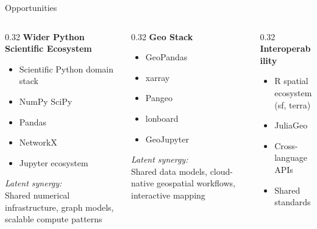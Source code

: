 \documentclass[11pt, aspectratio=169]{beamer}
\begin{document}
\begin{frame}{Opportunities}
\centering
\vspace{0.5cm}

\begin{columns}[T,onlytextwidth]

\begin{column}{0.32\textwidth}
\textbf{Wider Python Scientific Ecosystem}

\vspace{0.4cm}
\begin{itemize}
\item Scientific Python domain stack
\item NumPy SciPy
\item Pandas
\item NetworkX
\item Jupyter ecosystem
\end{itemize}

\vspace{0.3cm}
{\small \textit{Latent synergy:}}\\
Shared numerical infrastructure, graph models, scalable compute patterns
\end{column}

\begin{column}{0.32\textwidth}
\textbf{Geo Stack}

\vspace{0.4cm}
\begin{itemize}
\item GeoPandas
\item xarray
\item Pangeo
\item lonboard
\item GeoJupyter
\end{itemize}

\vspace{0.3cm}
{\small \textit{Latent synergy:}}\\
Shared data models, cloud-native geospatial workflows, interactive mapping
\end{column}

\begin{column}{0.32\textwidth}
\textbf{Interoperability}

\vspace{0.4cm}
\begin{itemize}
\item R spatial ecosystem (sf, terra)
\item JuliaGeo
\item Cross-language APIs
\item Shared standards
\end{itemize}


\end{column}
\end{columns}
\end{frame}
\end{document}
